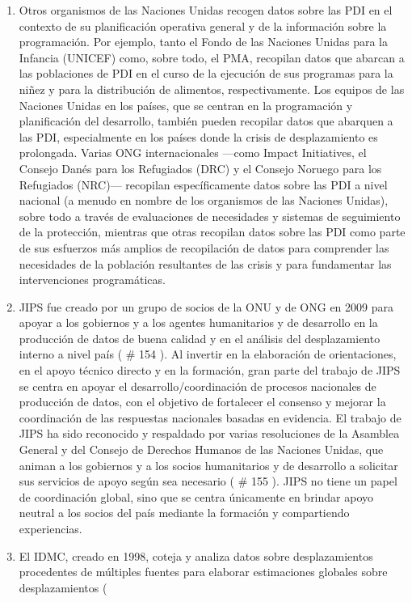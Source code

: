 \documentclass[
]{book}
\begin{document}
\begin{enumerate}
\item
  Otros organismos de las Naciones Unidas recogen datos sobre las PDI en el contexto de su planificación operativa general y de la información sobre la programación. Por ejemplo, tanto el Fondo de las Naciones Unidas para la Infancia (UNICEF) como, sobre todo, el PMA, recopilan datos que abarcan a las poblaciones de PDI en el curso de la ejecución de sus programas para la niñez y para la distribución de alimentos, respectivamente. Los equipos de las Naciones Unidas en los países, que se centran en la programación y planificación del desarrollo, también pueden recopilar datos que abarquen a las PDI, especialmente en los países donde la crisis de desplazamiento es prolongada. Varias ONG internacionales ---como Impact Initiatives, el Consejo Danés para los Refugiados (DRC) y el Consejo Noruego para los Refugiados (NRC)--- recopilan específicamente datos sobre las PDI a nivel nacional (a menudo en nombre de los organismos de las Naciones Unidas), sobre todo a través de evaluaciones de necesidades y sistemas de seguimiento de la protección, mientras que otras recopilan datos sobre las PDI como parte de sus esfuerzos más amplios de recopilación de datos para comprender las necesidades de la población resultantes de las crisis y para fundamentar las intervenciones programáticas.
\item
  JIPS fue creado por un grupo de socios de la ONU y de ONG en 2009 para apoyar a los gobiernos y a los agentes humanitarios y de desarrollo en la producción de datos de buena calidad y en el análisis del desplazamiento interno a nivel país (
  \# 154
  ). Al invertir en la elaboración de orientaciones, en el apoyo técnico directo y en la formación, gran parte del trabajo de JIPS se centra en apoyar el desarrollo/coordinación de procesos nacionales de producción de datos, con el objetivo de fortalecer el consenso y mejorar la coordinación de las respuestas nacionales basadas en evidencia. El trabajo de JIPS ha sido reconocido y respaldado por varias resoluciones de la Asamblea General y del Consejo de Derechos Humanos de las Naciones Unidas, que animan a los gobiernos y a los socios humanitarios y de desarrollo a solicitar sus servicios de apoyo según sea necesario (
  \# 155
  ). JIPS no tiene un papel de coordinación global, sino que se centra únicamente en brindar apoyo neutral a los socios del país mediante la formación y compartiendo experiencias.
\item
  El IDMC, creado en 1998, coteja y analiza datos sobre desplazamientos procedentes de múltiples fuentes para elaborar estimaciones globales sobre desplazamientos (

\end{enumerate}
\end{document}
